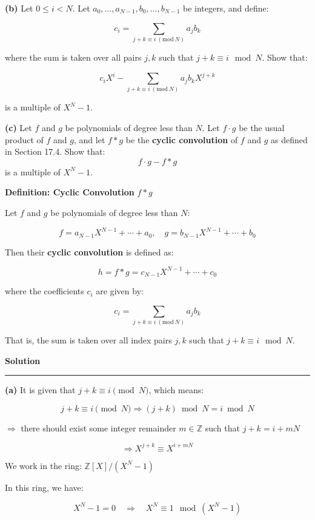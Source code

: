 \documentclass[a4paper,12pt]{article}
\begin{document}
\textbf{(b)} Let \(0 \leq i < N\). Let
\(a_0, \dots, a_{N-1}, b_0, \dots, b_{N-1}\) be integers, and define:

\[
c_i = \sum_{j + k \equiv i \ (\mathrm{mod}\ N)} a_j b_k
\]

where the sum is taken over all pairs \(j, k\) such that
\(j + k \equiv i \mod N\). Show that:

\[
c_i X^i - \sum_{j + k \equiv i \ (\mathrm{mod}\ N)} a_j b_k X^{j + k}
\]

is a multiple of \(X^N - 1\).

\textbf{(c)} Let \(f\) and \(g\) be polynomials of degree less than
\(N\). Let \(f \cdot g\) be the usual product of \(f\) and \(g\), and
let \(f * g\) be the \textbf{cyclic convolution} of \(f\) and \(g\) as
defined in Section 17.4. Show that: \[
f \cdot g - f * g
\] is a multiple of \(X^N - 1\).

\textbf{Definition: Cyclic Convolution} \(f * g\)

Let \(f\) and \(g\) be polynomials of degree less than \(N\):

\[
f = a_{N-1} X^{N-1} + \cdots + a_0, \quad
g = b_{N-1} X^{N-1} + \cdots + b_0
\]

Then their \textbf{cyclic convolution} is defined as:

\[
h = f * g = c_{N-1} X^{N-1} + \cdots + c_0
\]

where the coefficients \(c_i\) are given by:

\[
c_i = \sum_{j + k \equiv i \ (\mathrm{mod}\ N)} a_j b_k
\]

That is, the sum is taken over all index pairs \(j, k\) such that
\(j + k \equiv i \mod N\).

    \textbf{Solution}

\begin{center}\rule{0.5\linewidth}{0.5pt}\end{center}

\textbf{(a)} It is given that \(j + k \equiv i \pmod{N}\), which means:

\[
j + k \equiv i \pmod{N}
\Rightarrow (j + k) \bmod N = i \bmod N
\]

\(\Rightarrow\) there should exist some integer remainder
\(m \in \mathbb{Z}\) such that \(j + k = i + mN\)

\[
\Rightarrow X^{j+k} \equiv X^{i+mN}
\]

We work in the ring: \(\mathbb{Z}[X] / (X^N - 1)\)

In this ring, we have:

\[
X^N - 1 = 0 \quad \Rightarrow \quad X^N \equiv 1 \mod (X^N - 1)
\]
\end{document}
